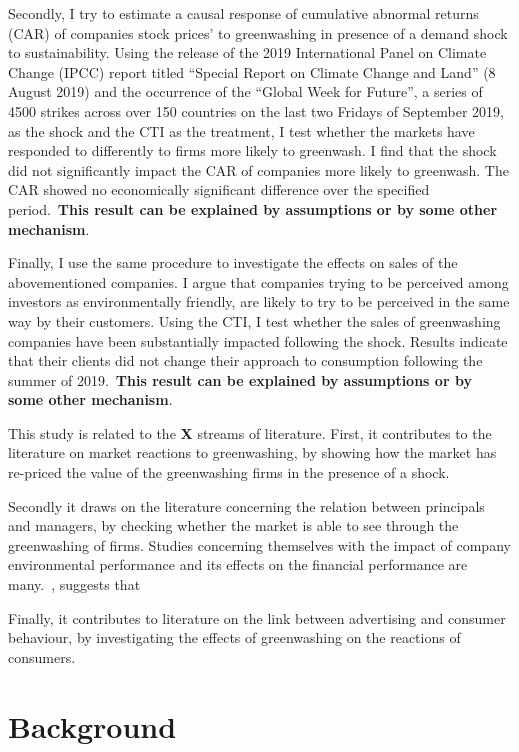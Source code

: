 \documentclass[12pt]{article}
\begin{document}
Secondly, I try to estimate a causal response of cumulative abnormal returns (CAR) of companies stock prices' to greenwashing in presence of a demand shock to sustainability. Using the release of the 2019 International Panel on Climate Change (IPCC) report titled ``Special Report on Climate Change and Land'' (8 August 2019) and the occurrence of the ``Global Week for Future'', a series of 4500 strikes across over 150 countries on the last two Fridays of September 2019, as the shock and the CTI as the treatment, I test whether the markets have responded to differently to firms more likely to greenwash. I find that the shock did not significantly impact the CAR of companies more likely to greenwash. The CAR showed no economically significant difference over the specified period.\ \textbf{This result can be explained by assumptions or by some other mechanism}.

Finally, I use the same procedure to investigate the effects on sales of the abovementioned companies. I argue that companies trying to be perceived among investors as environmentally friendly, are likely to try to be perceived in the same way by their customers. Using the CTI, I test whether the sales of greenwashing companies have been substantially impacted following the shock. Results indicate that their clients did not change their approach to consumption following the summer of 2019.\ \textbf{This result can be explained by assumptions or by some other mechanism}. 
 

This study is related to the \textbf{X} streams of literature. First, it contributes to the literature on market reactions to greenwashing, by showing how the market has re-priced the value of the greenwashing firms in the presence of a shock.  

Secondly it draws on the literature concerning the relation between principals and managers, by checking whether the market is able to see through the greenwashing of firms. Studies concerning themselves with the impact of company environmental performance and its effects on the financial performance are many.~\cite{ilhan_climate_2023}, suggests that 

Finally, it contributes to literature on the link between advertising and consumer behaviour, by investigating the effects of greenwashing on the reactions of consumers. 


\section{Background}\label{sect:background}
\end{document}
